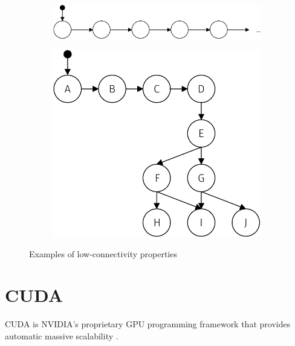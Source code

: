 \documentclass[
fancyheadings, %
%
%
]{stsreprt}
\begin{document}
\begin{figure}
    \begin{subfigure}[b]{.5\textwidth}
        \centering
        \includegraphics[width=\textwidth]{figures/lc-ex-generally-linear}
        \label{fig:lc-ex-generally-linear}
    \end{subfigure}
    \begin{subfigure}[b]{.5\textwidth}
        \centering
        \includegraphics[width=.9\textwidth]{figures/lc-ex-bottleneck}
        \label{fig:lc-ex-bottleneck}
    \end{subfigure}
    \caption{Examples of low-connectivity properties}
    \label{fig:lc-ex}
\end{figure}

\section{CUDA}
\label{section:background:cuda}

CUDA is NVIDIA's proprietary GPU programming framework that provides automatic massive scalability \cite{CUDA-Programming-Guide}.
\end{document}
